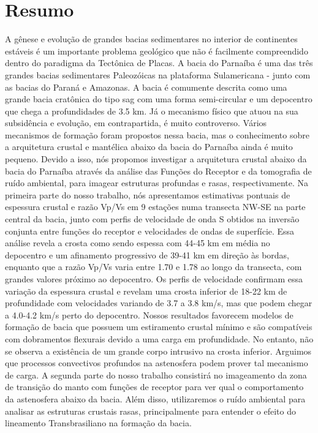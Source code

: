 \chapter*{Resumo}

A gênese e evolução de grandes bacias sedimentares no interior de continentes estáveis é um importante problema geológico que não é facilmente compreendido dentro do paradigma da Tectônica de Placas. A bacia do Parnaíba é uma das três grandes bacias sedimentares Paleozóicas na plataforma Sulamericana - junto com as bacias do Paraná e Amazonas. A bacia é comumente descrita como uma grande bacia cratônica do tipo sag com uma forma semi-circular e um depocentro que chega a profundidades de 3.5 km. Já o mecanismo físico que atuou na sua subsidência e evolução, em contrapartida, é muito controverso. Vários mecanismos de formação foram propostos nessa bacia, mas o conhecimento sobre a arquitetura crustal e mantélica abaixo da bacia do Parnaíba ainda é muito pequeno. Devido a isso, nós propomos investigar a arquitetura crustal abaixo da bacia do Parnaíba através da análise das Funções do Receptor e da tomografia de ruído ambiental, para imagear estruturas profundas e rasas, respectivamente. Na primeira parte do nosso trabalho, nós apresentamos estimativas pontuais de espessura crustal e razão Vp/Vs em 9 estações numa transecta NW-SE na parte central da bacia, junto com perfis de velocidade de onda S obtidos na inversão conjunta entre funções do receptor e velocidades de ondas de superfície. Essa análise revela a crosta como sendo espessa com 44-45 km em média no depocentro e um afinamento progressivo de 39-41 km em direção às bordas, enquanto que a razão Vp/Vs varia entre  1.70 e 1.78 ao longo da transecta, com grandes valores próximo ao depocentro. Os perfis de velocidade confirmam essa variação da espessura crustal e revelam uma crosta inferior de 18-22 km de profundidade com velocidades variando de 3.7 a 3.8 km/s, mas que podem chegar a 4.0-4.2 km/s perto do depocentro. Nossos resultados favorecem modelos de formação de bacia que possuem um estiramento crustal mínimo e são compatíveis com dobramentos flexurais devido a uma carga em profundidade. No entanto, não se observa a existência de um grande corpo intrusivo na crosta inferior. Arguimos que processos convectivos profundos na astenosfera podem prover tal mecanismo de carga. A segunda parte do nosso trabalho consistirá no imageamento da zona de transição do manto com funções de receptor para ver qual o comportamento da astenosfera abaixo da bacia. Além disso, utilizaremos o ruído ambiental para analisar as estruturas crustais rasas, principalmente para entender o efeito do lineamento Transbrasiliano na formação da bacia.